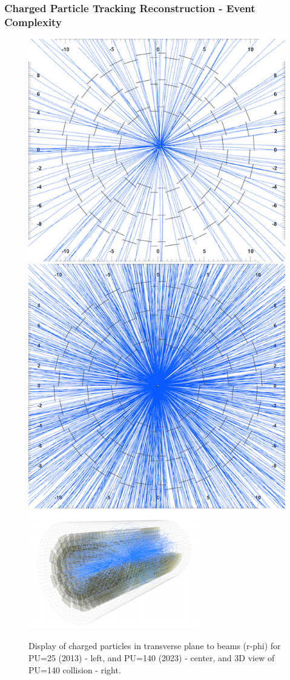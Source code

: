 \begin{frame}
\frametitle{Charged Particle Tracking Reconstruction - Event Complexity}

\begin{figure}[tbp]
\centering
\includegraphics[width=0.32\linewidth]{images/PU50ns_run2_RPhi.png}
\includegraphics[width=0.3\linewidth]{images/PU140_2023_RPhi.png}
\includegraphics[width=0.3\linewidth]{images/PU140-3D.png}

\caption{Display of charged particles in transverse plane to beams (r-phi) for
PU=25 (2013) - left, and PU=140 (2023) - center, and 3D view of
PU=140 collision - right.}
\end{figure}


\end{frame}


